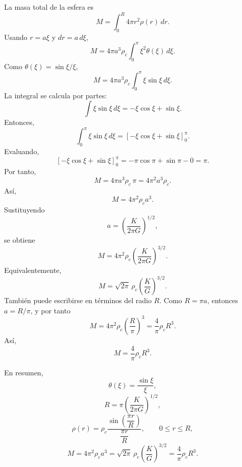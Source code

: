 \documentclass[12pt]{article}
\begin{document}
La masa total de la esfera es
$$
M=\int_0^R 4\pi r^{2}\rho(r)\,dr.
$$
Usando $r=a\xi$ y $dr=a\,d\xi$,
$$
M=4\pi a^{3}\rho_c\int_0^{\pi}\xi^{2}\theta(\xi)\,d\xi.
$$
Como $\theta(\xi)=\sin\xi/\xi$,
$$
M=4\pi a^{3}\rho_c\int_0^{\pi}\xi\sin\xi\,d\xi.
$$
La integral se calcula por partes:
$$
\int \xi\sin\xi\,d\xi
=-\xi\cos\xi+\sin\xi.
$$
Entonces,
$$
\int_0^{\pi}\xi\sin\xi\,d\xi
=\left[-\xi\cos\xi+\sin\xi\right]_0^{\pi}.
$$
Evaluando,
$$
\left[-\xi\cos\xi+\sin\xi\right]_0^{\pi}
=-\pi\cos\pi+\sin\pi-0
=\pi.
$$
Por tanto,
$$
M=4\pi a^{3}\rho_c\,\pi
=4\pi^{2}a^{3}\rho_c.
$$
Así,
$$
\boxed{
M=4\pi^{2}\rho_c a^{3}
}.
$$
Sustituyendo
$$
a=\left(\frac{K}{2\pi G}\right)^{1/2},
$$
se obtiene
$$
M=4\pi^{2}\rho_c
\left(\frac{K}{2\pi G}\right)^{3/2}.
$$
Equivalentemente,
$$
\boxed{
M=\sqrt{2\pi}\,\rho_c\left(\frac{K}{G}\right)^{3/2}
}.
$$
También puede escribirse en términos del radio $R$. Como $R=\pi a$, entonces $a=R/\pi$, y por tanto
$$
M=4\pi^{2}\rho_c\left(\frac{R}{\pi}\right)^{3}
=\frac{4}{\pi}\rho_c R^{3}.
$$
Así,
$$
\boxed{
M=\frac{4}{\pi}\rho_c R^{3}
}.
$$

En resumen,
$$
\boxed{
\theta(\xi)=\frac{\sin\xi}{\xi}
},
$$
$$
\boxed{
R=\pi\left(\frac{K}{2\pi G}\right)^{1/2}
},
$$
$$
\boxed{
\rho(r)=\rho_c
\frac{\sin\left(\dfrac{\pi r}{R}\right)}
{\dfrac{\pi r}{R}},
\qquad 0\le r\le R
},
$$
$$
\boxed{
M=4\pi^{2}\rho_c a^{3}
=\sqrt{2\pi}\,\rho_c\left(\frac{K}{G}\right)^{3/2}
=\frac{4}{\pi}\rho_c R^{3}
}.
$$
\end{document}
